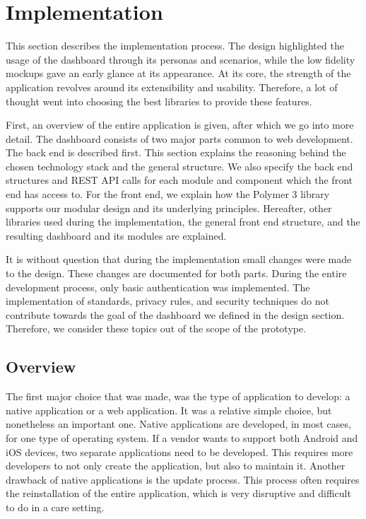 
\section{Implementation}\label{implementation}

This section describes the implementation process. The design highlighted the usage of the dashboard through its personas and scenarios, while the low fidelity mockups gave an early glance at its appearance. At its core, the strength of the application revolves around its extensibility and usability. Therefore, a lot of thought went into choosing the best libraries to provide these features.

First, an overview of the entire application is given, after which we go into more detail. The dashboard consists of two major parts common to web development. The back end is described first. This section explains the reasoning behind the chosen technology stack and the general structure. We also specify the back end structures and REST API calls for each module and component which the front end has access to. For the front end, we explain how the Polymer 3 library supports our modular design and its underlying principles. Hereafter, other libraries used during the implementation, the general front end structure, and the resulting dashboard and its modules are explained. 

It is without question that during the implementation small changes were made to the design. These changes are documented for both parts. During the entire development process, only basic authentication was implemented. The implementation of standards, privacy rules, and security techniques do not contribute towards the goal of the dashboard we defined in the design section. Therefore, we consider these topics out of the scope of the prototype.

    \subsection{Overview}

    The first major choice that was made, was the type of application to develop: a native application or a web application. It was a relative simple choice, but nonetheless an important one. Native applications are developed, in most cases, for one type of operating system. If a vendor wants to support both Android and iOS devices, two separate applications need to be developed. This requires more developers to not only create the application, but also to maintain it. Another drawback of native applications is the update process. This process often requires the reinstallation of the entire application, which is very disruptive and difficult to do in a care setting.

